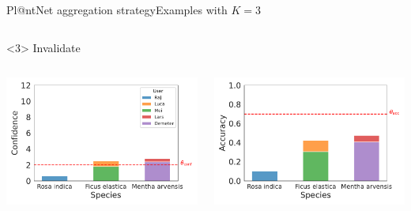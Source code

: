 \begin{frame}{Pl@ntNet aggregation strategy}{Examples with $K=3$}
\begin{onlyenv}
\begin{columns}
\begin{column}{.5\textwidth}
\begin{center}
                \end{center}
            \end{column}
        \end{columns}
    \end{onlyenv}
    \begin{onlyenv}<3>
        Invalidate\phantom{g}
        \begin{columns}
            \begin{column}{.5\textwidth}
                \begin{center}
                    \includegraphics[width=\textwidth]{./images/histplot_conf_invalidate.pdf}
                \end{center}
            \end{column}
            \begin{column}{.5\textwidth}
                \begin{center}
                    \includegraphics[width=\textwidth]{./images/histplot_acc_invalidate.pdf}
                \end{center}
            \end{column}
        \end{columns}
    \end{onlyenv}
\end{frame}

